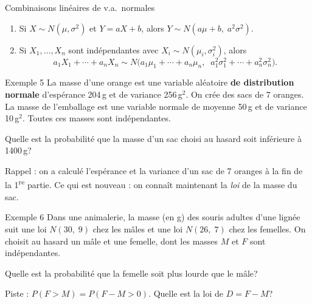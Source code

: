 \documentclass{BeamerTemplate}
\begin{document}
\begin{frame}[t]{Combinaisons linéaires de v.a.\ normales}
  \begin{prp}
    \begin{enumerate}\itemsep 2mm
      \item Si $X \sim N(\mu, \sigma^2)$ et $Y = aX + b$, alors
        $Y \sim N(a\mu + b,\; a^2\sigma^2)$.
      \item Si $X_1, \ldots, X_n$ sont \alert{indépendantes} avec
        $X_i \sim N(\mu_i, \sigma_i^2)$, alors
        \[
          a_1 X_1 + \cdots + a_n X_n \sim
          N\big(a_1\mu_1 + \cdots + a_n\mu_n,\;\; a_1^2\sigma_1^2 + \cdots + a_n^2\sigma_n^2\big).
        \]
    \end{enumerate}
  \end{prp}

\end{frame}

\begin{frame}[t]{Exemple 5}
  La masse d'une orange est une variable aléatoire \textbf{de distribution
  normale} d'espérance 204\,g et de variance 256\,g$^2$. On crée des sacs de 7
  oranges. La masse de l'emballage est une variable normale de moyenne 50\,g
  et de variance 10\,g$^2$. Toutes ces masses sont indépendantes.

  \medskip
  Quelle est la probabilité que la masse d'un sac choisi au hasard soit
  inférieure à 1400\,g?

  \vspace{2.5cm}
  {\small\color{gray} Rappel : on a calculé l'espérance et la variance d'un sac
  de 7 oranges à la fin de la 1\textsuperscript{re} partie. Ce qui est
  nouveau : on connaît maintenant la \emph{loi} de la masse du sac.}
\end{frame}

\begin{frame}[t]{Exemple 6}
  Dans une animalerie, la masse (en g) des souris adultes d'une lignée suit une
  loi $N(30,\; 9)$ chez les mâles et une loi $N(26,\; 7)$ chez les femelles.
  On choisit au hasard un mâle et une femelle, dont les masses $M$ et $F$ sont
  indépendantes.

  \medskip
  \alert{Quelle est la probabilité que la femelle soit plus lourde que le mâle?}

  \vspace{2.5cm}
  {\small\color{gray} Piste : $P(F > M) = P(F - M > 0)$. Quelle est la loi de $D = F - M$?}
\end{frame}
\end{document}
